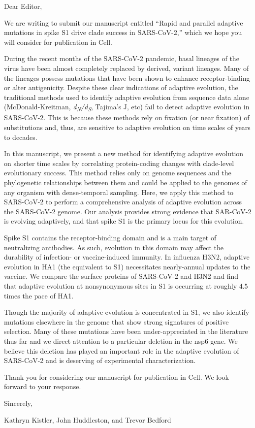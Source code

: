 \documentclass[11pt,oneside,letterpaper]{article}
\begin{document}
Dear Editor,
\bigskip
\bigskip

We are writing to submit our manuscript entitled “Rapid and parallel adaptive mutations in spike S1 drive clade success in SARS-CoV-2,” which we hope you will consider for publication in Cell.

During the recent months of the SARS-CoV-2 pandemic, basal lineages of the virus have been almost completely replaced by derived, variant lineages. Many of the lineages possess mutations that have been shown to enhance receptor-binding or alter antigenicity. Despite these clear indications of adaptive evolution, the traditional methods used to identify adaptive evolution from sequence data alone (McDonald-Kreitman, \emph{d\textsubscript{N}/d\textsubscript{S}}, Tajima’s J, etc) fail to detect adaptive evolution in SARS-CoV-2. This is because these methods rely on fixation (or near fixation) of substitutions and, thus, are sensitive to adaptive evolution on time scales of years to decades. 

In this manuscript, we present a new method for identifying adaptive evolution on shorter time scales by correlating protein-coding changes with clade-level evolutionary success. This method relies only on genome sequences and the phylogenetic relationships between them and could be applied to the genomes of any organism with dense-temporal sampling. Here, we apply this method to SARS-CoV-2 to perform a comprehensive analysis of adaptive evolution across the SARS-CoV-2 genome. Our analysis provides strong evidence that SAR-CoV-2 is evolving adaptively, and that spike S1 is the primary locus for this evolution. 

Spike S1 contains the receptor-binding domain and is a main target of neutralizing antibodies. As such, evolution in this domain may affect the durability of infection- or vaccine-induced immunity. In influenza H3N2, adaptive evolution in HA1 (the equivalent to S1) necessitates nearly-annual updates to the vaccine. We compare the surface proteins of SARS-CoV-2 and H3N2 and find that adaptive evolution at nonsynonymous sites in S1 is occurring at roughly 4.5 times the pace of HA1.

Though the majority of adaptive evolution is concentrated in S1, we also identify mutations elsewhere in the genome that show strong signatures of positive selection. Many of these mutations have been under-appreciated in the literature thus far and we direct attention to a particular deletion in the nsp6 gene. We believe this deletion has played an important role in the adaptive evolution of SARS-CoV-2 and is deserving of experimental characterization.

Thank you for considering our manuscript for publication in Cell. We look forward to your response.

\bigskip
\bigskip
\bigskip
Sincerely,

Kathryn Kistler, John Huddleston, and Trevor Bedford
\end{document}
